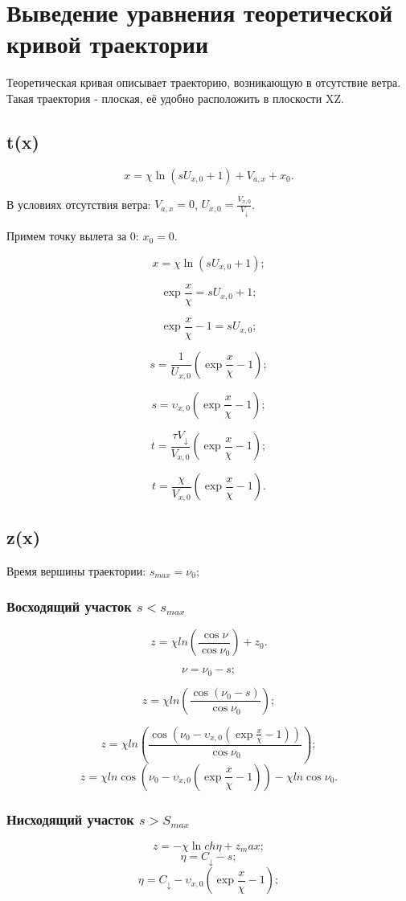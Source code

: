 \section{Выведение уравнения теоретической кривой траектории}

Теоретическая кривая описывает траекторию, возникающую в отсутствие ветра. Такая траектория - плоская, её удобно расположить в плоскости XZ.

\subsection{t(x)}

$$x = \chi \ln(sU_{x,0}+1) + V_{a,x} + x_0.$$

В условиях отсутствия ветра: $V_{a,x} = 0$, $U_{x,0}=\frac{V_{x,0}}{V_\downarrow}$.

Примем точку вылета за 0: $x_0 = 0$.

$$x = \chi \ln(sU_{x,0}+1);$$

$$\exp\frac{x}{\chi} = sU_{x,0}+1;$$

$$\exp\frac{x}{\chi} - 1 = sU_{x,0};$$

$$s = \frac{1}{U_{x,0}}\left ( \exp\frac{x}{\chi} - 1\right );$$

$$s = \upsilon_{x,0} \left ( \exp\frac{x}{\chi} - 1\right );$$

$$t = \frac{\tau V_\downarrow}{V_{x,0}}\left ( \exp\frac{x}{\chi} - 1\right );$$

$$t = \frac{\chi}{V_{x,0}}\left ( \exp\frac{x}{\chi} - 1\right ).$$


\subsection{z(x)}

Время вершины траектории: $s_{max}= \nu_{0};$

\subsubsection{Восходящий участок $s<s_{max}$}
$$z = \chi ln \left (  \frac{\cos \nu}{\cos \nu_{0}}  \right )  +  z_0.$$

$$\nu = \nu_0 - s;$$

$$z = \chi ln \left (  \frac{\cos(\nu_0 - s)}{\cos \nu_{0}}  \right );$$

$$z = \chi ln \left (  \frac{\cos \left(\nu_0 - \upsilon_{x,0} \left ( \exp\frac{x}{\chi} - 1\right ) \right )}{\cos \nu_{0}}  \right );$$
$$z = \chi ln \cos \left (
		\nu_0 - \upsilon_{x,0} \left ( \exp\frac{x}{\chi} - 1\right )  
	\right )
	- \chi ln \cos \nu_{0}.
$$
\subsubsection{Нисходящий участок $s>S_{max}$}

$$z = -\chi \ln ch\eta + z_max;$$
$$\eta = C_\downarrow - s;$$
$$\eta = C_\downarrow - \upsilon_{x,0} \left ( \exp\frac{x}{\chi} - 1\right );$$

